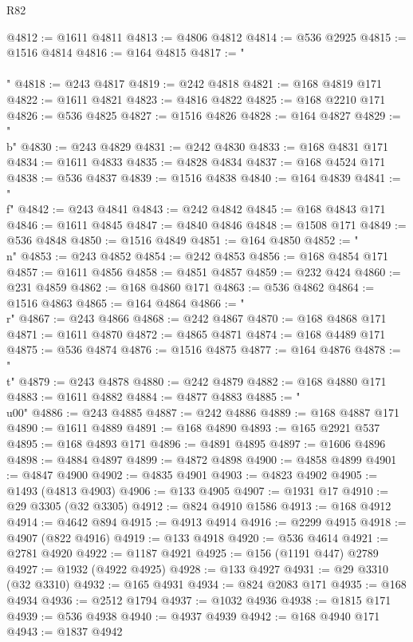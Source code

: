 \begin{lexlean}{R82}
\begin{coremodule}
@4812 := @1611 @4811
@4813 := @4806 @4812
@4814 := @536 @2925
@4815 := @1516 @4814
@4816 := @164 @4815
@4817 := "\\\\"
@4818 := @243 @4817
@4819 := @242 @4818
@4821 := @168 @4819 @171
@4822 := @1611 @4821
@4823 := @4816 @4822
@4825 := @168 @2210 @171
@4826 := @536 @4825
@4827 := @1516 @4826
@4828 := @164 @4827
@4829 := "\\b"
@4830 := @243 @4829
@4831 := @242 @4830
@4833 := @168 @4831 @171
@4834 := @1611 @4833
@4835 := @4828 @4834
@4837 := @168 @4524 @171
@4838 := @536 @4837
@4839 := @1516 @4838
@4840 := @164 @4839
@4841 := "\\f"
@4842 := @243 @4841
@4843 := @242 @4842
@4845 := @168 @4843 @171
@4846 := @1611 @4845
@4847 := @4840 @4846
@4848 := @1508 @171
@4849 := @536 @4848
@4850 := @1516 @4849
@4851 := @164 @4850
@4852 := "\\n"
@4853 := @243 @4852
@4854 := @242 @4853
@4856 := @168 @4854 @171
@4857 := @1611 @4856
@4858 := @4851 @4857
@4859 := @232 @424
@4860 := @231 @4859
@4862 := @168 @4860 @171
@4863 := @536 @4862
@4864 := @1516 @4863
@4865 := @164 @4864
@4866 := "\\r"
@4867 := @243 @4866
@4868 := @242 @4867
@4870 := @168 @4868 @171
@4871 := @1611 @4870
@4872 := @4865 @4871
@4874 := @168 @4489 @171
@4875 := @536 @4874
@4876 := @1516 @4875
@4877 := @164 @4876
@4878 := "\\t"
@4879 := @243 @4878
@4880 := @242 @4879
@4882 := @168 @4880 @171
@4883 := @1611 @4882
@4884 := @4877 @4883
@4885 := "\\u00"
@4886 := @243 @4885
@4887 := @242 @4886
@4889 := @168 @4887 @171
@4890 := @1611 @4889
@4891 := @168 @4890
@4893 := @165 @2921 @537
@4895 := @168 @4893 @171
@4896 := @4891 @4895
@4897 := @1606 @4896
@4898 := @4884 @4897
@4899 := @4872 @4898
@4900 := @4858 @4899
@4901 := @4847 @4900
@4902 := @4835 @4901
@4903 := @4823 @4902
@4905 := @1493 (@4813 @4903)
@4906 := @133 @4905
@4907 := @1931 @17
@4910 := @29 @3305 (@32 @3305)
@4912 := @824 @4910 @1586
@4913 := @168 @4912
@4914 := @4642 @894
@4915 := @4913 @4914
@4916 := @2299 @4915
@4918 := @4907 (@822 @4916)
@4919 := @133 @4918
@4920 := @536 @4614
@4921 := @2781 @4920
@4922 := @1187 @4921
@4925 := @156 (@1191 @447) @2789
@4927 := @1932 (@4922 @4925)
@4928 := @133 @4927
@4931 := @29 @3310 (@32 @3310)
@4932 := @165 @4931
@4934 := @824 @2083 @171
@4935 := @168 @4934
@4936 := @2512 @1794
@4937 := @1032 @4936
@4938 := @1815 @171
@4939 := @536 @4938
@4940 := @4937 @4939
@4942 := @168 @4940 @171
@4943 := @1837 @4942

\end{coremodule}
\end{lexlean}
